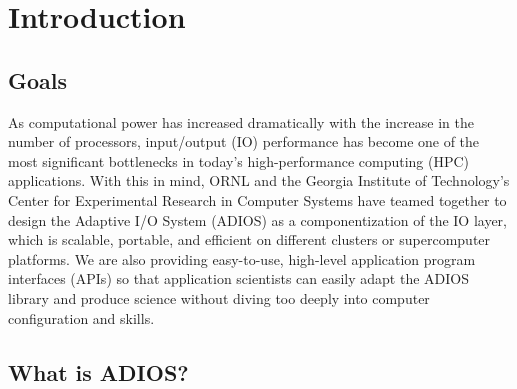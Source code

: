 \section{Introduction}

\subsection{Goals}

\leftskip=0pt
\parindent=0pt
As computational power has increased dramatically with the increase in the number 
of processors, input/output (IO) performance has become one of the most significant 
bottlenecks in today's high-performance computing (HPC) applications. With this 
in mind, ORNL and the Georgia Institute of Technology's Center for Experimental 
Research in Computer Systems have teamed together to design the Adaptive I/O System 
(ADIOS) as a componentization of the IO layer, which is scalable, portable, and 
efficient on different clusters or supercomputer platforms. We are also providing 
easy-to-use, high-level application program interfaces (APIs) so that application 
scientists can easily adapt the ADIOS library and produce science without diving 
too deeply into computer configuration and skills. \label{HToc84890216}\label{HToc212016591}\label{HToc212016833}\label{HToc182553324}

\subsection{What is ADIOS?}

